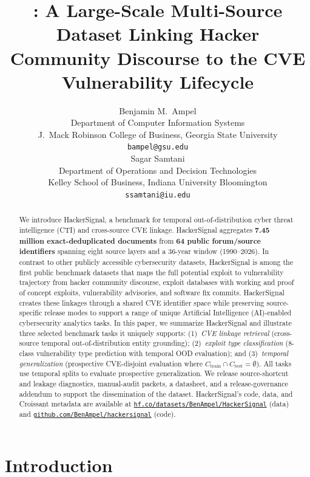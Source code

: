 \documentclass{article}
\title{\etg: A Large-Scale Multi-Source Dataset Linking Hacker Community
       Discourse to the CVE Vulnerability Lifecycle}
\author{%
  Benjamin M.\ Ampel \\
  Department of Computer Information Systems \\
  J.\ Mack Robinson College of Business, Georgia State University \\
  \texttt{bampel@gsu.edu} \\
  \And
  Sagar Samtani \\
  Department of Operations and Decision Technologies \\
  Kelley School of Business, Indiana University Bloomington \\
  \texttt{ssamtani@iu.edu} \\
}
\begin{document}
\maketitle

\begin{abstract}

We introduce HackerSignal, a benchmark for temporal out-of-distribution cyber threat intelligence (CTI) and cross-source CVE linkage. HackerSignal aggregates \textbf{7.45 million exact-deduplicated documents} from \textbf{64 public forum/source identifiers} spanning eight source layers and a 36-year window (1990--2026). In contrast to other publicly accessible cybersecurity datasets, HackerSignal is among the first public benchmark datasets that maps the full potential exploit to vulnerability trajectory from hacker community discourse, exploit databases with working and proof of concept exploits, vulnerability advisories, and software fix commits. HackerSignal creates these linkages through a shared CVE identifier space while preserving source-specific release modes to support a range of unique Artificial Intelligence (AI)-enabled cybersecurity analytics tasks. In this paper, we summarize HackerSignal and illustrate three selected benchmark tasks it uniquely supports: (1)~\emph{CVE linkage retrieval} (cross-source temporal out-of-distribution entity grounding); (2)~\emph{exploit type classification} (8-class vulnerability type prediction with temporal OOD evaluation); and (3)~\emph{temporal generalization} (prospective CVE-disjoint evaluation where $C_{\text{train}} \cap C_{\text{test}} = \emptyset$). All tasks use temporal splits to evaluate prospective generalization. We release source-shortcut and leakage diagnostics, manual-audit packets, a datasheet, and a release-governance addendum to support the dissemination of the dataset. HackerSignal's code, data, and Croissant metadata are available at \href{https://huggingface.co/datasets/BenAmpel/HackerSignal}{\texttt{hf.co/datasets/BenAmpel/HackerSignal}} (data) and \href{https://github.com/BenAmpel/hackersignal}{\texttt{github.com/BenAmpel/hackersignal}} (code).
\end{abstract}

\section{Introduction}
\end{document}
